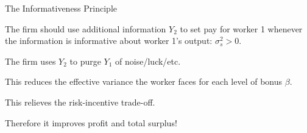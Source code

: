 \documentclass[aspectratio=169,usenames,dvipsnames]{beamer}
\newenvironment{wideitemize}{\itemize\addtolength{\itemsep}{10pt}}{\enditemize}
\begin{document}
\begin{frame}{The Informativeness Principle}

    \begin{theorem}
        The firm should use additional information $Y_2$ to set pay for worker 1 whenever the information is informative about worker 1's output: $\sigma_s^2>0$.
    \end{theorem}

    \begin{wideitemize}
    \item The firm uses $Y_2$ to purge $Y_1$ of noise/luck/etc.
    \item This reduces the effective variance the worker faces for each level of bonus $\beta$.
    \item This relieves the risk-incentive trade-off.
    \item Therefore it improves profit and total surplus!
\end{wideitemize}


\end{frame}
\end{document}
